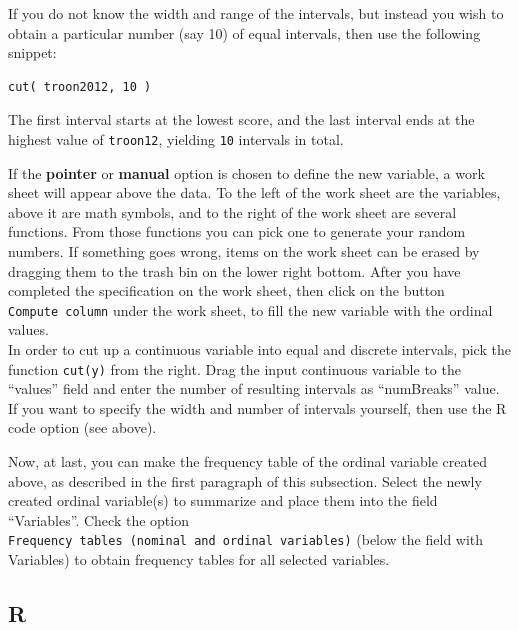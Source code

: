 \documentclass[
]{book}
\newenvironment{Shaded}{\begin{snugshade}}{\end{snugshade}}
\newcommand{\AttributeTok}[1]{\textcolor[rgb]{0.13,0.29,0.53}{#1}}
\newcommand{\ConstantTok}[1]{\textcolor[rgb]{0.56,0.35,0.01}{#1}}
\newcommand{\FunctionTok}[1]{\textcolor[rgb]{0.13,0.29,0.53}{\textbf{#1}}}
\newcommand{\NormalTok}[1]{#1}
\newcommand{\OtherTok}[1]{\textcolor[rgb]{0.56,0.35,0.01}{#1}}
\newcommand{\SpecialCharTok}[1]{\textcolor[rgb]{0.81,0.36,0.00}{\textbf{#1}}}
\newcommand{\StringTok}[1]{\textcolor[rgb]{0.31,0.60,0.02}{#1}}
\begin{document}
If you do not know the width and range of the intervals, but instead you wish to obtain a particular number (say 10) of equal intervals, then use the following snippet:

\begin{verbatim}
cut( troon2012, 10 ) 
\end{verbatim}

The first interval starts at the lowest score, and the last interval ends at the highest value of \texttt{troon12}, yielding \texttt{10} intervals in total.

If the \textbf{pointer} or \textbf{manual} option is chosen to define the new variable, a work sheet will appear above the data. To the left of the work sheet are the variables, above it are math symbols, and to the right of the work sheet are several functions. From those functions you can pick one to generate your random numbers. If something goes wrong, items on the work sheet can be erased by dragging them to the trash bin on the lower right bottom. After you have completed the specification on the work sheet, then click on the button \texttt{Compute\ column} under the work sheet, to fill the new variable with the ordinal values.\\
In order to cut up a continuous variable into equal and discrete intervals, pick the function \texttt{cut(y)} from the right. Drag the input continuous variable to the ``values'' field and enter the number of resulting intervals as ``numBreaks'' value. If you want to specify the width and number of intervals yourself, then use the R code option (see above).

Now, at last, you can make the frequency table of the ordinal variable created above, as described in the first paragraph of this subsection. Select the newly created ordinal variable(s) to summarize and place them into the field ``Variables''. Check the option \texttt{Frequency\ tables\ (nominal\ and\ ordinal\ variables)} (below the field with Variables) to obtain frequency tables for all selected variables.

\subsection{R}\label{r-1}

\begin{Shaded}
\end{Shaded}
\end{document}
